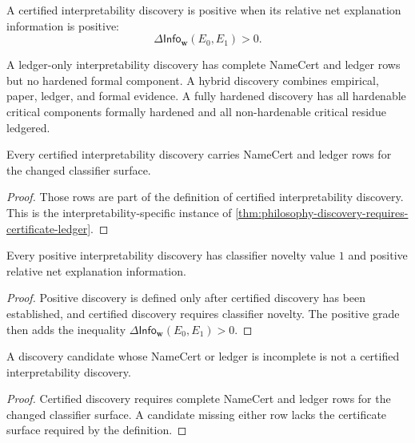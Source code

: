 \begin{definition}
\label{def:philosophy-positive-interpretability-discovery-grade}
A certified interpretability discovery is positive when its relative net
explanation information is positive:
$$
\Delta\mathsf{Info}_{\mathbf w}(E_0,E_1)>0.
$$
\end{definition}

\begin{definition}
\label{def:philosophy-discovery-evidence-grades}
A ledger-only interpretability discovery has complete NameCert and ledger
rows but no hardened formal component. A hybrid discovery combines
empirical, paper, ledger, and formal evidence. A fully hardened discovery
has all hardenable critical components formally hardened and all
non-hardenable critical residue ledgered.
\end{definition}

\begin{theorem}
\label{thm:philosophy-certified-discovery-requires-namecert-ledger}
Every certified interpretability discovery carries NameCert and ledger
rows for the changed classifier surface.
\end{theorem}
\begin{proof}
Those rows are part of the definition of certified interpretability
discovery. This is the interpretability-specific instance of
\autoref{thm:philosophy-discovery-requires-certificate-ledger}.
\end{proof}

\begin{theorem}
\label{thm:philosophy-positive-discovery-requires-novelty-net-gain}
Every positive interpretability discovery has classifier novelty value
$1$ and positive relative net explanation information.
\end{theorem}
\begin{proof}
Positive discovery is defined only after certified discovery has been
established, and certified discovery requires classifier novelty. The
positive grade then adds the inequality
$\Delta\mathsf{Info}_{\mathbf w}(E_0,E_1)>0$.
\end{proof}

\begin{theorem}
\label{thm:philosophy-discovery-candidate-not-certified-discovery}
A discovery candidate whose NameCert or ledger is incomplete is not a
certified interpretability discovery.
\end{theorem}
\begin{proof}
Certified discovery requires complete NameCert and ledger rows for the
changed classifier surface. A candidate missing either row lacks the
certificate surface required by the definition.
\end{proof}

